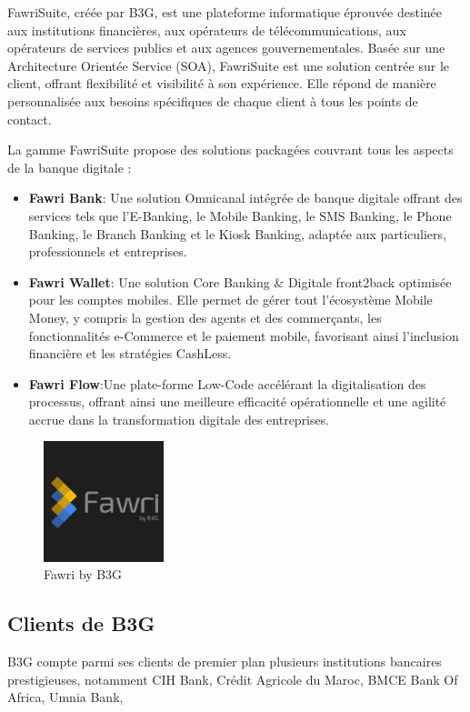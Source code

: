 FawriSuite, créée par B3G, est une plateforme informatique éprouvée destinée aux institutions financières, aux opérateurs de télécommunications, aux opérateurs de services publics et aux agences gouvernementales. Basée sur une Architecture Orientée Service (SOA), FawriSuite est une solution centrée sur le client, offrant flexibilité et visibilité à son expérience. Elle répond de manière personnalisée aux besoins spécifiques de chaque client à tous les points de contact.

La gamme FawriSuite propose des solutions packagées couvrant tous les aspects de la banque digitale :
\begin{itemize}
    \item \textbf{Fawri Bank}: Une solution Omnicanal intégrée de banque digitale offrant des services tels que l'E-Banking, le Mobile Banking, le SMS Banking, le Phone Banking, le Branch Banking et le Kiosk Banking, adaptée aux particuliers, professionnels et entreprises.
    \item \textbf{Fawri Wallet}: Une solution Core Banking \& Digitale front2back optimisée pour les comptes mobiles. Elle permet de gérer tout l'écosystème Mobile Money, y compris la gestion des agents et des commerçants, les fonctionnalités e-Commerce et le paiement mobile, favorisant ainsi l'inclusion financière et les stratégies CashLess.
    \item \textbf{Fawri Flow}:Une plate-forme Low-Code accélérant la digitalisation des processus, offrant ainsi une meilleure efficacité opérationnelle et une agilité accrue dans la transformation digitale des entreprises.


\end{itemize}



\begin{figure}[H]
    \centering
    \includegraphics[width=3.5cm]{Logos/fawri.png}
    \caption{Fawri by B3G}
    \label{fig:my_label} %
\end{figure}

\subsection{Clients de B3G}
\hspace{\parindent}B3G compte parmi ses clients de premier plan plusieurs institutions bancaires prestigieuses, notamment CIH Bank, Crédit Agricole du Maroc, BMCE Bank Of Africa, Umnia Bank,


